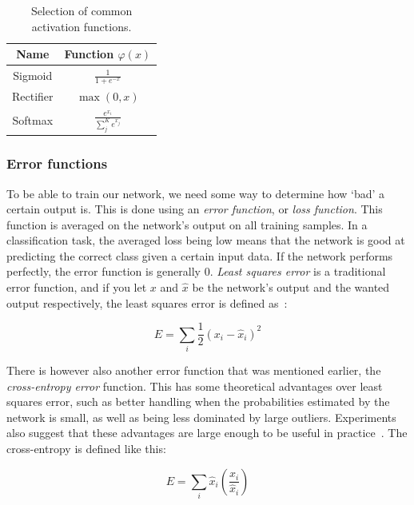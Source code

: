 \documentclass{kththesis}
\renewcommand{\arraystretch}{1.2}
\begin{document}
\begin{table}[h]
  \renewcommand{\arraystretch}{1.2}
  \begin{center}
    \caption{Selection of common activation functions.}
    \label{tab:activation_functions}
    \begin{tabular}{cc}
      \textbf{Name} & \textbf{Function} $\varphi(x)$\\
      \toprule
      Sigmoid & $\displaystyle \frac{1}{1 + e^{-x}} $ \\[4mm]
      Rectifier & $\displaystyle \max(0, x)$ \\[3mm]
      Softmax & $\displaystyle \frac{e^{x_i}}{\sum_j^K{e^{x_j}}}$ \\
    \end{tabular}
  \end{center}
\end{table}

\subsubsection{Error functions}
To be able to train our network, we need some way to determine how `bad' a certain output is. This is done using an \textit{error function}, or \textit{loss function}. This function is averaged on the network's output on all training samples. In a classification task, the averaged loss being low means that the network is good at predicting the correct class given a certain input data. If the network performs perfectly, the error function is generally $0$. \textit{Least squares error} is a traditional error function, and if you let $x$ and $\hat{x}$ be the network's output and the wanted output respectively, the least squares error is defined as~\cite{mlfIntro}:

\[ E = \sum_i{\frac{1}{2}(x_i - \hat{x}_i)^2} \] 

There is however also another error function that was mentioned earlier, the \textit{cross-entropy error} function. This has some theoretical advantages over least squares error, such as better handling when the probabilities estimated by the network is small, as well as being less dominated by large outliers. Experiments also suggest that these advantages are large enough to be useful in practice~\cite{crossentropy_squared}. The cross-entropy is defined like this:

\[ E = \sum_i{\hat{x}_i\left(\frac{x_i}{\hat{x}_i}\right)} \]
\end{document}
